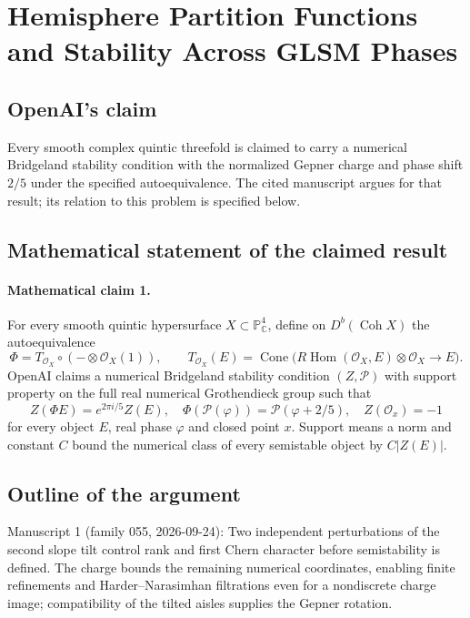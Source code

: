 \documentclass[11pt]{article}
\begin{document}
\section*{Hemisphere Partition Functions and Stability Across GLSM Phases}

\subsection{OpenAI's claim}
Every smooth complex quintic threefold is claimed to carry a numerical Bridgeland stability condition with the normalized Gepner charge and phase shift $2/5$ under the specified autoequivalence. The cited manuscript argues for that result; its relation to this problem is specified below.

\subsection{Mathematical statement of the claimed result}
\paragraph{Mathematical claim 1.} For every smooth quintic hypersurface $X\subset\mathbb P^4_{\mathbb C}$, define on $D^b(\operatorname{Coh}X)$ the autoequivalence
\[
\Phi=T_{\mathcal O_X}\circ(-\otimes\mathcal O_X(1)),\qquad
T_{\mathcal O_X}(E)=\operatorname{Cone}\bigl(R\operatorname{Hom}(\mathcal O_X,E)\otimes\mathcal O_X\to E\bigr).
\]
OpenAI claims a numerical Bridgeland stability condition $(Z,\mathcal P)$ with support property on the full real numerical Grothendieck group such that
\[
Z(\Phi E)=e^{2\pi i/5}Z(E),\quad
\Phi(\mathcal P(\varphi))=\mathcal P(\varphi+2/5),\quad
Z(\mathcal O_x)=-1
\]
for every object $E$, real phase $\varphi$ and closed point $x$. Support means a norm and constant $C$ bound the numerical class of every semistable object by $C|Z(E)|$.

\subsection{Outline of the argument}
Manuscript 1 (family 055, 2026-09-24): Two independent perturbations of the second slope tilt control rank and first Chern character before semistability is defined. The charge bounds the remaining numerical coordinates, enabling finite refinements and Harder--Narasimhan filtrations even for a nondiscrete charge image; compatibility of the tilted aisles supplies the Gepner rotation.
\end{document}
